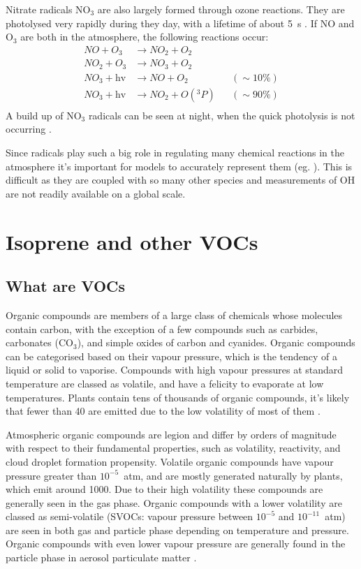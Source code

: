   Nitrate radicals NO$_3$ are also largely formed through ozone reactions.
  They are photolysed very rapidly during they day, with a lifetime of about 5~s \citep{Atkinson2000}.
  If NO and O$_3$ are both in the atmosphere, the following reactions \citep{Atkinson2000} occur:
  \begin{align*}
  	\label{LR:O3andAQ:Radicals:O3toNO2}
    NO + O_3         & \to NO_2 + O_2      && \\%
    NO_2 + O_3       & \to NO_3 + O_2      && \\%
    NO_3 + \text{hv} & \to NO + O_2        && (\sim 10\%) \\%
    NO_3 + \text{hv} & \to NO_2 + O({}^3P) && (\sim 90\%) \\%
  \end{align*}
  A build up of NO$_3$ radicals can be seen at night, when the quick photolysis is not occurring \citep{Atkinson2000,Brown2009}.
  
  Since radicals play such a big role in regulating many chemical reactions in the atmosphere it's important for models to accurately represent them (eg. \cite{Travis2014}). 
  This is difficult as they are coupled with so many other species and measurements of OH are not readily available on a global scale.

\section{Isoprene and other VOCs}
  \label{LR:O3andAQ:VOCs}
  \subsection{What are VOCs}
    Organic compounds are members of a large class of chemicals whose molecules contain carbon, with the exception of a few compounds such as carbides, carbonates (CO$_3$), and simple oxides of carbon and cyanides.
    Organic compounds can be categorised based on their vapour pressure, which is the tendency of a liquid or solid to vaporise.
    Compounds with high vapour pressures at standard temperature are classed as volatile, and have a felicity to evaporate at low temperatures.
    Plants contain tens of thousands of organic compounds, it's likely that fewer than 40 are emitted due to the low volatility of most of them \citep{Guenther2000}.
    
    Atmospheric organic compounds are legion and differ by orders of magnitude with respect to their fundamental properties, such as volatility, reactivity, and cloud droplet formation propensity.
    Volatile organic compounds have vapour pressure greater than $10^{-5}$~atm, and are mostly generated naturally by plants, which emit around 1000\tgpyr \citep{Guenther1995, Glasius2016}.
    Due to their high volatility these compounds are generally seen in the gas phase.
    Organic compounds with a lower volatility are classed as semi-volatile (SVOCs: vapour pressure between $10^{-5}$ and $10^{-11}$~atm) are seen in both gas and particle phase depending on temperature and pressure.
    Organic compounds with even lower vapour pressure are generally found in the particle phase in aerosol particulate matter \citep{Glasius2016}.
    
